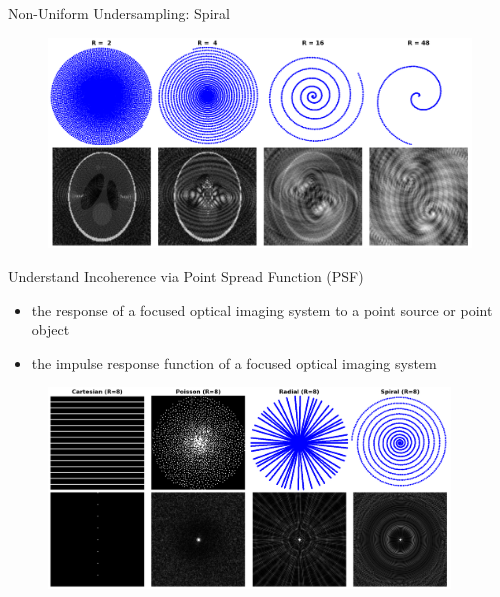 \documentclass[aspectratio=169]{beamer}
\begin{document}
	\begin{frame}{Non-Uniform Undersampling: Spiral}
		\begin{figure}
			\centering
			\includegraphics[width=\textwidth]{figures/usamp_spiral.png}
		\end{figure}
	\end{frame}
	
	\begin{frame}{Understand Incoherence via Point Spread Function (PSF)}
		\begin{itemize}
			\item the response of a focused optical imaging system to a point source or point object
			\item the impulse response function of a focused optical imaging system
		\end{itemize}
		
		\begin{figure}
			\centering
			\includegraphics[width=0.95\textwidth]{figures/usamp_psf.png}
		\end{figure}
	\end{frame}
	
\end{document}
